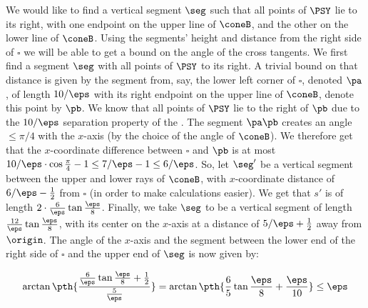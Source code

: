                 We would like to find a vertical segment $\seg$ such that all
                points of $\PSY$ lie to its right, with one endpoint on the upper
                line of $\coneB$, and the other on the lower line of
                $\coneB$. Using the segments' height and distance from the right
                side of $\square$ we will be able to get a bound on the angle of
                the cross tangents. We first find a segment $\seg$ with all points
                of $\PSY$ to its right. A trivial bound on that distance is given
                by the segment from, say, the lower left corner of $\square$,
                denoted $\pa$, of length $10/\eps$ with its right endpoint on the
                upper line of $\coneB$, denote this point by $\pb$. We know that
                all points of $\PSY$ lie to the right of $\pb$ due to the
                $10/\eps$ separation property of the \SSPD. The segment $\pa\pb$
                creates an angle $\leq\pi/4$ with the $x$-axis (by the choice of
                the angle of $\coneB$).  We therefore get that the $x$-coordinate
                difference between $\square$ and $\pb$ is at most
                $10/\eps\cdot \cos\frac{\pi}{4}-1\leq 7/\eps-1\leq 6/\eps$. So,
                let $\seg'$ be a vertical segment between the upper and lower rays
                of $\coneB$, with $x$-coordinate distance of $6/\eps-\frac{1}{2}$
                from $\square$ (in order to make calculations easier). We get that
                $s'$ is of length $2\cdot \frac{6}{\eps}\tan
                \frac{\eps}{8}$. Finally, we take $\seg$ to be a vertical segment
                of length $\frac{12}{\eps}\tan \frac{\eps}{8}$, with its center on
                the $x$-axis at a distance of $5/\eps+\frac{1}{2}$ away from
                $\origin$. The angle of the $x$-axis and the segment between the
                lower end of the right side of $\square$ and the upper end of
                $\seg$ is now given by:
                
                \begin{equation*}
                        \arctan
                        \pth{\frac{\frac{6}{\eps}
                                        \tan\frac{\eps}{8}+\frac{1}{2}}{\frac{5}{\eps}}
                        }%
                        =%
                        \arctan \pth{ \frac{6}{5}\tan\frac{\eps}{8}+\frac{\eps}{10} }%
                        \leq%
                        \eps%
                \end{equation*}
